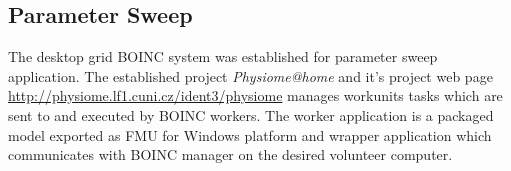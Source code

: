 \subsection{Parameter Sweep}
\label{sec:resultsboinc}
The desktop grid BOINC system was established for parameter sweep application. The established project \emph{Physiome@home} and it's project web page \url{http://physiome.lf1.cuni.cz/ident3/physiome} manages workunits tasks which are sent to and executed by BOINC workers. The worker application is a packaged model exported as FMU for Windows platform and wrapper application which communicates with BOINC manager on the desired volunteer computer. 


%

